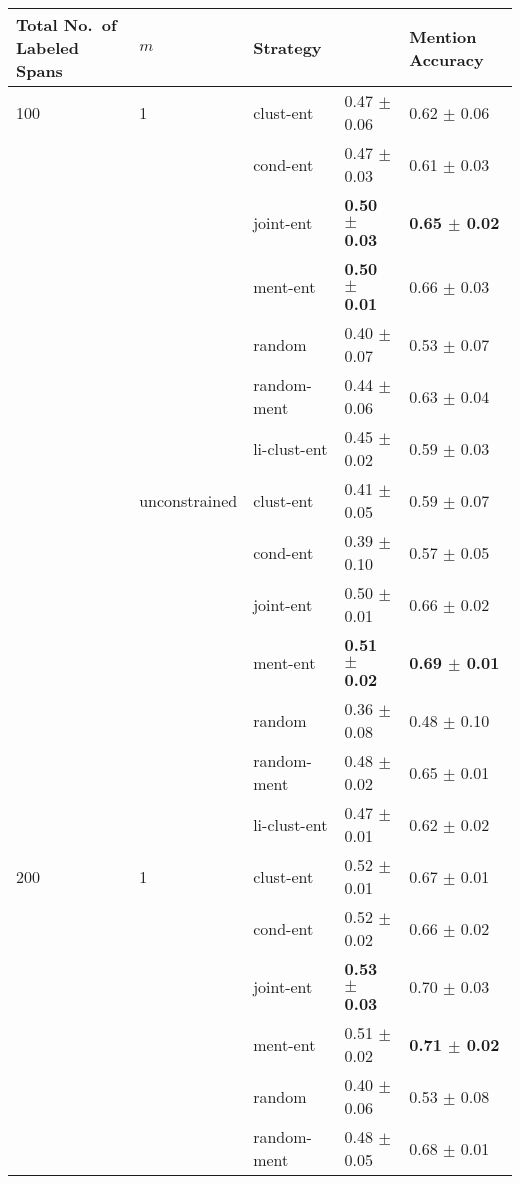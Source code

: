 \begin{table*}
    \centering
\begin{tabular}{lllll}
\toprule
    Total No.~of Labeled Spans & $m$ & Strategy & \avgfone{} & Mention Accuracy \\
\midrule
100 & 1 & clust-ent &  0.47 $\pm$ 0.06 &  0.62 $\pm$ 0.06 \\
    &               & cond-ent &  0.47 $\pm$ 0.03 &  0.61 $\pm$ 0.03 \\
    &               & joint-ent &  \textbf{0.50 $\pm$ 0.03} &  \textbf{0.65 $\pm$ 0.02} \\
    &               & ment-ent &  \textbf{0.50 $\pm$ 0.01} &  0.66 $\pm$ 0.03 \\
    &               & random &  0.40 $\pm$ 0.07 &  0.53 $\pm$ 0.07 \\
    &               & random-ment &  0.44 $\pm$ 0.06 &  0.63 $\pm$ 0.04 \\
    &               & li-clust-ent &  0.45 $\pm$ 0.02 &  0.59 $\pm$ 0.03 \\
    \cline{2-5}
    & unconstrained & clust-ent &  0.41 $\pm$ 0.05 &  0.59 $\pm$ 0.07 \\
    &               & cond-ent &  0.39 $\pm$ 0.10 &  0.57 $\pm$ 0.05 \\
    &               & joint-ent &  0.50 $\pm$ 0.01 &  0.66 $\pm$ 0.02 \\
    &               & ment-ent &  \textbf{0.51 $\pm$ 0.02} &  \textbf{0.69 $\pm$ 0.01} \\
    &               & random &  0.36 $\pm$ 0.08 &  0.48 $\pm$ 0.10 \\
    &               & random-ment &  0.48 $\pm$ 0.02 &  0.65 $\pm$ 0.01 \\
    &               & li-clust-ent &  0.47 $\pm$ 0.01 &  0.62 $\pm$ 0.02 \\
    \cline{1-5}
200 & 1 & clust-ent &  0.52 $\pm$ 0.01 &  0.67 $\pm$ 0.01 \\
    &               & cond-ent &  0.52 $\pm$ 0.02 &  0.66 $\pm$ 0.02 \\
    &               & joint-ent &  \textbf{0.53 $\pm$ 0.03} &  0.70 $\pm$ 0.03 \\
    &               & ment-ent &  0.51 $\pm$ 0.02 &  \textbf{0.71 $\pm$ 0.02} \\
    &               & random &  0.40 $\pm$ 0.06 &  0.53 $\pm$ 0.08 \\
    &               & random-ment &  0.48 $\pm$ 0.05 &  0.68 $\pm$ 0.01 \\

\end{tabular}
\end{table*}
